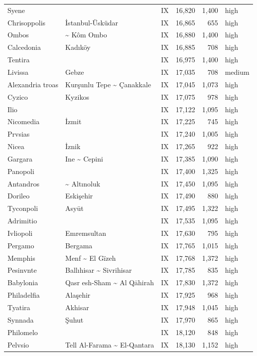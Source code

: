 \documentclass[11pt,a4paper]{article}
\begin{document}
{\begin{longtable}{p{4.6cm}p{5.2cm}lrrl}
Syene &  & IX & 16,820 & 1,400 & high\\
Chrisoppolis & İstanbul-Üsküdar & IX & 16,865 & 655 & high\\
Ombos & \textasciitilde{} Kôm Ombo & IX & 16,880 & 1,400 & high\\
Calcedonia & Kadıköy & IX & 16,885 & 708 & high\\
Tentira &  & IX & 16,975 & 1,400 & high\\
Livissa & Gebze & IX & 17,035 & 708 & medium\\
Alexandria troas & Kurşunlu Tepe \textasciitilde{} Çanakkale & IX & 17,045 & 1,073 & high\\
Cyzico & Kyzikos & IX & 17,075 & 978 & high\\
Ilio &  & IX & 17,122 & 1,095 & high\\
Nicomedia & İzmit & IX & 17,225 & 745 & high\\
Prvsias &  & IX & 17,240 & 1,005 & high\\
Nicea & İznik & IX & 17,265 & 922 & high\\
Gargara & Ine \textasciitilde{} Cepini & IX & 17,385 & 1,090 & high\\
Panopoli &  & IX & 17,400 & 1,325 & high\\
Antandros & \textasciitilde{} Altınoluk & IX & 17,450 & 1,095 & high\\
Dorileo & Eskişehir & IX & 17,490 & 880 & high\\
Tyconpoli & Asyūt & IX & 17,495 & 1,322 & high\\
Adrimitio &  & IX & 17,535 & 1,095 & high\\
Ivliopoli & Emremsultan & IX & 17,630 & 795 & high\\
Pergamo & Bergama & IX & 17,765 & 1,015 & high\\
Memphis & Menf \textasciitilde{} El Gïzeh & IX & 17,768 & 1,372 & high\\
Pesinvnte & Ballıhisar \textasciitilde{} Sivrihisar & IX & 17,785 & 835 & high\\
Babylonia & Qasr esh-Sham \textasciitilde{} Al Qāhirah & IX & 17,830 & 1,372 & high\\
Philadelfia & Alaşehir & IX & 17,925 & 968 & high\\
Tyatira & Akhisar & IX & 17,948 & 1,045 & high\\
Synnada & Şuhut & IX & 17,970 & 865 & high\\
Philomelo &  & IX & 18,120 & 848 & high\\
Pelvsio & Tell Al-Farama \textasciitilde{} El-Qantara & IX & 18,130 & 1,152 & high\\

\end{longtable}}
\end{document}
